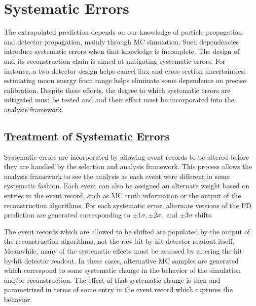 \chapter{Systematic Errors}
\label{systs_chapter}

The extrapolated prediction depends on our knowledge of particle propagation
and detector propagation, mainly through MC simulation.
Such dependencies introduce systematic errors when that knowledge is incomplete.
The design of \nova and its reconstruction chain is aimed at mitigating
systematic errors.
For instance, a two detector design helps
cancel flux and cross section uncertainties; estimating muon energy
from range helps eliminate some dependence on precise calibration.
Despite these efforts, the degree to which systematic errors are mitigated
must be tested and and their effect must be incorporated into the
analysis framework.


\section{Treatment of Systematic Errors}

Systematic errors are incorporated by allowing
event records to be altered before they are handled by the
selection and analysis framework.
This process allows the analysis framework to see the analysis as each
event were different in some systematic fashion.
Each event can also be assigned an alternate weight based
on entries in the event record, such as MC truth information or
the output of the reconstruction algorithms.
For each systematic error, alternate versions of the FD prediction
are generated corresponding to $\pm 1\sigma, \pm2\sigma,$ and
$\pm3\sigma$ shifts.

The event records which are allowed to be shifted are populated by
the output of the reconstruction algorithms,
not the raw hit-by-hit detector readout itself.
Meanwhile, many of the systematic effects must be assessed by altering the
hit-by-hit detector readout.
In these cases, alternative MC samples are generated which
correspond to some systematic change in the behavior of the
simulation and/or reconstruction.
The effect of that systematic change is then
and parametrized in terms of some entry in the event record which
captures the behavior.

